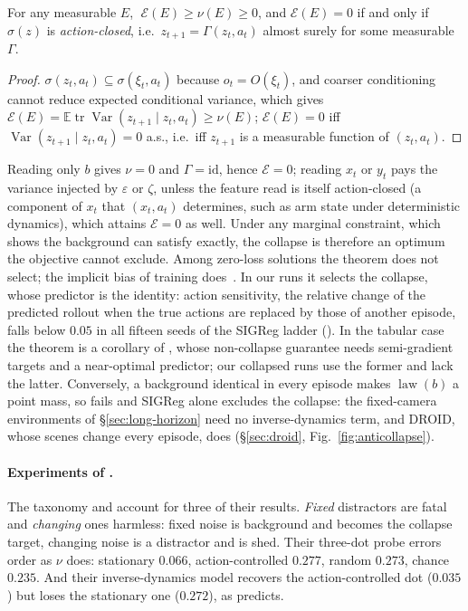 \begin{theorem}
\label{thm:sf-optimality}
For any measurable $E$, $\;\mathcal{E}(E)\geq\nu(E)\geq 0$, and $\mathcal{E}(E) = 0$ if and
only if $\sigma(z)$ is \emph{action-closed}, i.e.\ $z_{t+1} = \Gamma(z_t,a_t)$ almost surely
for some measurable $\Gamma$.
\end{theorem}

\begin{proof}
$\sigma(z_t,a_t)\subseteq\sigma(\xi_t,a_t)$ because $o_t = O(\xi_t)$, and coarser conditioning cannot reduce expected conditional variance, which gives $\mathcal{E}(E) = \mathbb{E}\operatorname{tr}\operatorname{Var}(z_{t+1}\mid z_t,a_t) \geq \nu(E)$; $\mathcal{E}(E) = 0$ iff $\operatorname{Var}(z_{t+1}\mid z_t,a_t) = 0$ a.s., i.e.\ iff $z_{t+1}$ is a measurable function of $(z_t,a_t)$.
\end{proof}

Reading only $b$ gives $\nu = 0$ and $\Gamma = \mathrm{id}$, hence $\mathcal{E} = 0$; reading
$x_t$ or $y_t$ pays the variance injected by $\varepsilon$ or $\zeta$, unless the feature read is itself action-closed (a component of $x_t$ that $(x_t,a_t)$ determines, such as arm state under deterministic dynamics), which attains $\mathcal{E} = 0$ as well. Under any marginal constraint, which  shows the background can satisfy exactly, the collapse is therefore an optimum the objective cannot exclude. Among zero-loss solutions the theorem does not select; the implicit bias of training does~\citep{littwin2024how}. In our runs it selects the collapse, whose predictor is the identity: action sensitivity, the relative change of the predicted rollout when the
true actions are replaced by those of another episode, falls below $0.05$ in all fifteen seeds of the SIGReg ladder (). In the tabular case the theorem is a corollary of \citet[Thm.~6]{tang2023understanding_self_predictive}, whose non-collapse guarantee needs semi-gradient targets and a near-optimal predictor; our collapsed runs use the former and lack the latter. Conversely, a background identical in every episode makes $\operatorname{law}(b)$ a point mass, so  fails and SIGReg alone excludes the collapse: the fixed-camera environments of \S\ref{sec:long-horizon} need no inverse-dynamics term, and DROID, whose scenes change every episode, does (\S\ref{sec:droid}, Fig.~\ref{fig:anticollapse}).

\paragraph{Experiments of \citet{sobal2022slowfeatures}.}
The taxonomy and  account for three of their results. \emph{Fixed} distractors are fatal and \emph{changing} ones
harmless: fixed noise is background and becomes the
collapse target, changing noise is a distractor and is shed. Their three-dot probe errors
order as $\nu$ does: stationary $0.066$, action-controlled $0.277$, random $0.273$, chance
$0.235$. And their inverse-dynamics model recovers the action-controlled dot ($0.035$) but
loses the stationary one ($0.272$), as  predicts.

